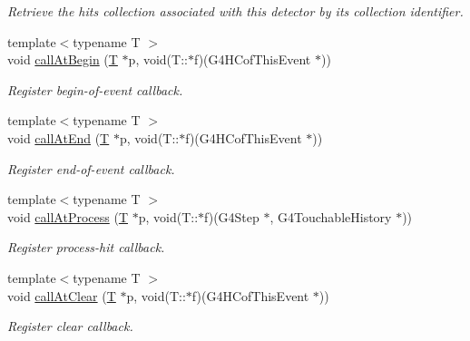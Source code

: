 \begin{DoxyCompactItemize}
\begin{DoxyCompactList}\small\item\em Retrieve the hits collection associated with this detector by its collection identifier. \item\end{DoxyCompactList}\item 
{\footnotesize template$<$typename T $>$ }\\void \hyperlink{class_d_d4hep_1_1_simulation_1_1_geant4_sens_det_action_sequence_a7905b361bff7168ed4aaf91743f287f2}{callAtBegin} (\hyperlink{class_t}{T} $\ast$p, void(T::$\ast$f)(G4HCofThisEvent $\ast$))
\begin{DoxyCompactList}\small\item\em Register begin-\/of-\/event callback. \item\end{DoxyCompactList}\item 
{\footnotesize template$<$typename T $>$ }\\void \hyperlink{class_d_d4hep_1_1_simulation_1_1_geant4_sens_det_action_sequence_ade99ad7b09ea4aca99de6af0ecba4149}{callAtEnd} (\hyperlink{class_t}{T} $\ast$p, void(T::$\ast$f)(G4HCofThisEvent $\ast$))
\begin{DoxyCompactList}\small\item\em Register end-\/of-\/event callback. \item\end{DoxyCompactList}\item 
{\footnotesize template$<$typename T $>$ }\\void \hyperlink{class_d_d4hep_1_1_simulation_1_1_geant4_sens_det_action_sequence_a89a1ba859a0048eeab83244e9d4bc9b3}{callAtProcess} (\hyperlink{class_t}{T} $\ast$p, void(T::$\ast$f)(G4Step $\ast$, G4TouchableHistory $\ast$))
\begin{DoxyCompactList}\small\item\em Register process-\/hit callback. \item\end{DoxyCompactList}\item 
{\footnotesize template$<$typename T $>$ }\\void \hyperlink{class_d_d4hep_1_1_simulation_1_1_geant4_sens_det_action_sequence_a5c9a64cfbcc0b52ee1c18c0432705bfb}{callAtClear} (\hyperlink{class_t}{T} $\ast$p, void(T::$\ast$f)(G4HCofThisEvent $\ast$))
\begin{DoxyCompactList}\small\item\em Register clear callback. \item\end{DoxyCompactList}\item 

\end{DoxyCompactItemize}
